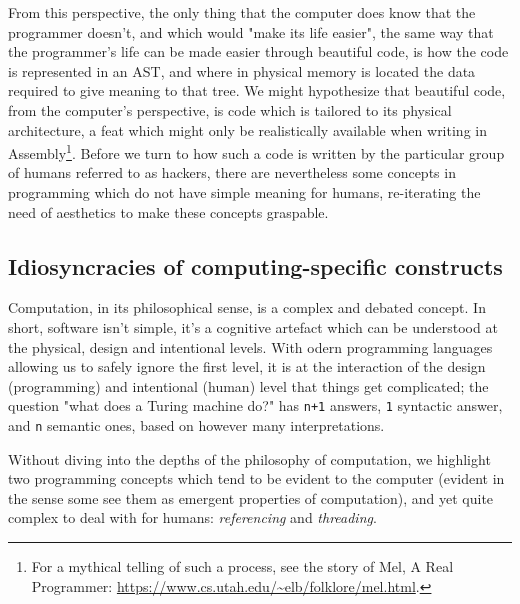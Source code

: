 \documentclass{article}
\begin{document}
From this perspective, the only thing that the computer does know that the programmer doesn't, and which would "make its life easier", the same way that the programmer's life can be made easier through beautiful code, is how the code is represented in an AST, and where in physical memory is located the data required to give meaning to that tree\cite{stansifer_study_1994}. We might hypothesize that beautiful code, from the computer's perspective, is code which is tailored to its physical architecture, a feat which might only be realistically available when writing in Assembly\footnote{For a mythical telling of such a process, see the story of Mel, A Real Programmer: \url{https://www.cs.utah.edu/~elb/folklore/mel.html}.}. Before we turn to how such a code is written by the particular group of humans referred to as hackers, there are nevertheless some concepts in programming which do not have simple meaning for humans, re-iterating the need of aesthetics to make these concepts graspable.

\vspace{1\baselineskip}

\subsection{Idiosyncracies of computing-specific constructs}

Computation, in its philosophical sense, is a complex and debated concept\cite{rapaport_philosophy_2005,smith_origin_1998}. In short, software isn't simple, it's a cognitive artefact which can be understood at the physical, design and intentional levels\cite{moor_three_1978}. With odern programming languages allowing us to safely ignore the first level, it is at the interaction of the design (programming) and intentional (human) level that things get complicated; the question "what does a Turing machine do?" has \lstinline{n+1} answers, \lstinline{1} syntactic answer, and \lstinline{n} semantic ones, based on however many interpretations.

Without diving into the depths of the philosophy of computation, we highlight two programming concepts which tend to be evident to the computer (evident in the sense some see them as emergent properties of computation), and yet quite complex to deal with for humans: \emph{referencing} and \emph{threading}.
\end{document}
